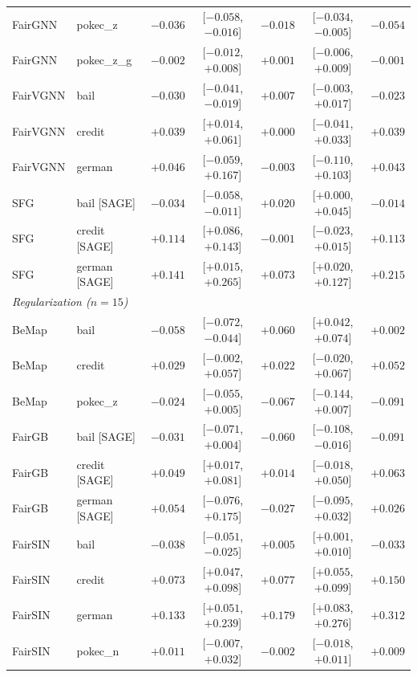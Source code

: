\begin{table}[t]
\begin{tabular}{llrcrcr}
FairGNN & pokec\_z & $-0.036$ & [$-0.058$, $-0.016$] & $-0.018$ & [$-0.034$, $-0.005$] & $-0.054$ \\
FairGNN & pokec\_z\_g & $-0.002$ & [$-0.012$, $+0.008$] & $+0.001$ & [$-0.006$, $+0.009$] & $-0.001$ \\
\midrule
FairVGNN & bail & $-0.030$ & [$-0.041$, $-0.019$] & $+0.007$ & [$-0.003$, $+0.017$] & $-0.023$ \\
FairVGNN & credit & $+0.039$ & [$+0.014$, $+0.061$] & $+0.000$ & [$-0.041$, $+0.033$] & $+0.039$ \\
FairVGNN & german & $+0.046$ & [$-0.059$, $+0.167$] & $-0.003$ & [$-0.110$, $+0.103$] & $+0.043$ \\
\midrule
SFG & bail [SAGE] & $-0.034$ & [$-0.058$, $-0.011$] & $+0.020$ & [$+0.000$, $+0.045$] & $-0.014$ \\
SFG & credit [SAGE] & $+0.114$ & [$+0.086$, $+0.143$] & $-0.001$ & [$-0.023$, $+0.015$] & $+0.113$ \\
SFG & german [SAGE] & $+0.141$ & [$+0.015$, $+0.265$] & $+0.073$ & [$+0.020$, $+0.127$] & $+0.215$ \\
\midrule
\multicolumn{7}{l}{\textit{Regularization ($n=15$)}} \\
BeMap & bail & $-0.058$ & [$-0.072$, $-0.044$] & $\mathbf{+0.060}$ & [$+0.042$, $+0.074$] & $+0.002$ \\
BeMap & credit & $+0.029$ & [$-0.002$, $+0.057$] & $+0.022$ & [$-0.020$, $+0.067$] & $+0.052$ \\
BeMap & pokec\_z & $-0.024$ & [$-0.055$, $+0.005$] & $-0.067$ & [$-0.144$, $+0.007$] & $-0.091$ \\
\midrule
FairGB & bail [SAGE] & $-0.031$ & [$-0.071$, $+0.004$] & $-0.060$ & [$-0.108$, $-0.016$] & $-0.091$ \\
FairGB & credit [SAGE] & $+0.049$ & [$+0.017$, $+0.081$] & $+0.014$ & [$-0.018$, $+0.050$] & $+0.063$ \\
FairGB & german [SAGE] & $+0.054$ & [$-0.076$, $+0.175$] & $-0.027$ & [$-0.095$, $+0.032$] & $+0.026$ \\
\midrule
FairSIN & bail & $-0.038$ & [$-0.051$, $-0.025$] & $+0.005$ & [$+0.001$, $+0.010$] & $-0.033$ \\
FairSIN & credit & $+0.073$ & [$+0.047$, $+0.098$] & $\mathbf{+0.077}$ & [$+0.055$, $+0.099$] & $+0.150$ \\
FairSIN & german & $+0.133$ & [$+0.051$, $+0.239$] & $\mathbf{+0.179}$ & [$+0.083$, $+0.276$] & $+0.312$ \\
FairSIN & pokec\_n & $+0.011$ & [$-0.007$, $+0.032$] & $-0.002$ & [$-0.018$, $+0.011$] & $+0.009$ \\

\end{tabular}
\end{table}
